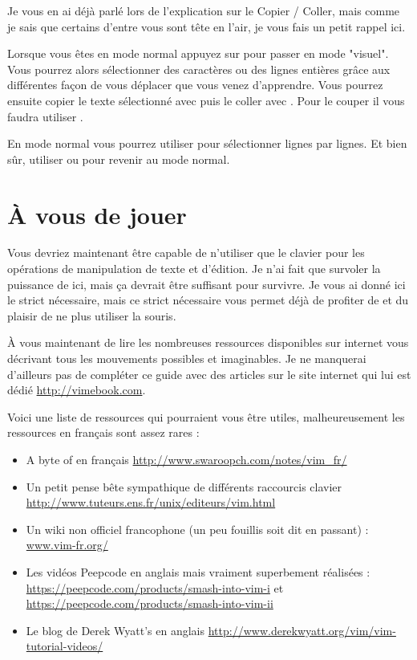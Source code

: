 Je vous en ai déjà parlé lors de l'explication sur le Copier / Coller, mais comme je sais que certains d'entre vous sont tête en l'air, je vous fais un petit rappel ici.

Lorsque vous êtes en mode \og normal \fg{} appuyez sur \ttv pour passer en mode "visuel". Vous pourrez alors sélectionner des caractères ou des lignes entières grâce aux différentes façon de vous déplacer que vous venez d'apprendre. Vous pourrez ensuite copier le texte sélectionné avec \tty\xspace puis le coller avec \ttp. Pour le couper il vous faudra utiliser \ttd.

En mode normal vous pourrez utiliser \ttV pour sélectionner lignes par lignes. Et bien sûr, utiliser \ttesc ou \vimcmd{;;} pour revenir au mode normal.

\section{À vous de jouer}

Vous devriez maintenant être capable de n'utiliser que le clavier pour les opérations de manipulation de texte et d'édition. Je n'ai fait que survoler la puissance de \vim ici, mais ça devrait être suffisant pour survivre. Je vous ai donné ici le strict nécessaire, mais ce strict nécessaire vous permet déjà de profiter de \vim et du plaisir de ne plus utiliser la souris.

À vous maintenant de lire les nombreuses ressources disponibles sur internet vous décrivant tous les mouvements possibles et imaginables. Je ne manquerai d'ailleurs pas de compléter ce guide avec des articles sur le site internet qui lui est dédié \url{http://vimebook.com}.

\bigskip
Voici une liste de ressources qui pourraient vous être utiles, malheureusement les ressources en français sont assez rares :

\begin{itemize}
    \item A byte of \vim en français \url{http://www.swaroopch.com/notes/vim_fr/}
    \item Un petit pense bête sympathique de différents raccourcis clavier \url{http://www.tuteurs.ens.fr/unix/editeurs/vim.html}
    \item Un wiki non officiel francophone (un peu fouillis soit dit en passant) : \url{www.vim-fr.org/}
    \item Les vidéos Peepcode en anglais mais vraiment superbement réalisées : \url{https://peepcode.com/products/smash-into-vim-i} et \url{https://peepcode.com/products/smash-into-vim-ii}
    \item Le blog de Derek Wyatt's en anglais \url{http://www.derekwyatt.org/vim/vim-tutorial-videos/}
\end{itemize}

